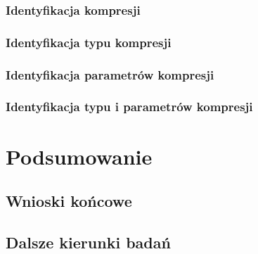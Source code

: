 \documentclass[pl,12pt]{aghdpl}
\let\Oldchapter\chapter%
\renewcommand{\chapter}{\FloatBarrier\Oldchapter}
\let\Oldsection\section%
\renewcommand{\section}{\FloatBarrier\Oldsection}
\let\Oldsubsection\subsection%
\renewcommand{\subsection}{\FloatBarrier\Oldsubsection}
\begin{document}
\subsection{Identyfikacja kompresji}
\subsection{Identyfikacja typu kompresji}
\subsection{Identyfikacja parametrów kompresji}
\subsection{Identyfikacja typu i parametrów kompresji}
\chapter{Podsumowanie}
\section{Wnioski końcowe}
\section{Dalsze kierunki badań}

\cleardoublepage{}
\printbibliography{}
\end{document}
